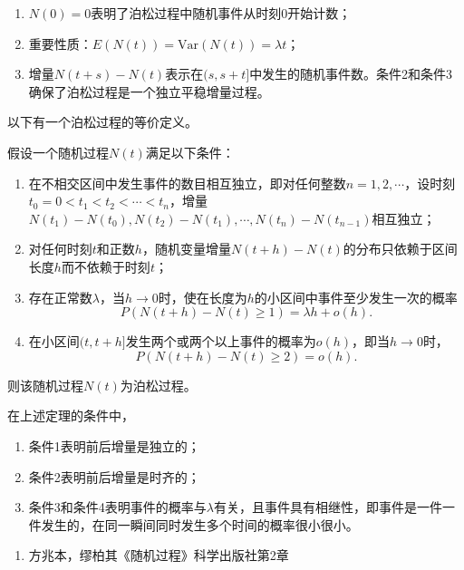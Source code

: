 \begin{remark}
    \begin{enumerate}
        \item $N(0)=0$表明了泊松过程中随机事件从时刻0开始计数；
        \item 重要性质：$E(N(t)) = \text{Var}(N(t)) = \lambda t$；
        \item 增量$N(t+s) - N(t)$表示在$(s,s+t]$中发生的随机事件数。条件2和条件3确保了泊松过程是一个独立平稳增量过程。
    \end{enumerate}
\end{remark}
以下有一个泊松过程的等价定义。
\begin{theorem}
    假设一个随机过程$N(t)$满足以下条件：
    \begin{enumerate}
        \item  在不相交区间中发生事件的数目相互独立，即对任何整数$n=1,2,\cdots$，设时刻$t_0 = 0 < t_1 < t_2 < \cdots < t_n$，增量$N(t_1) - N(t_0), N(t_2)-N(t_1),\cdots,N(t_n) - N(t_{n-1})$相互独立；
        \item 对任何时刻$t$和正数$h$，随机变量增量$N(t+h) - N(t)$的分布只依赖于区间长度$h$而不依赖于时刻$t$；
        \item 存在正常数$\lambda$，当$h\rightarrow0$时，使在长度为$h$的小区间中事件至少发生一次的概率
              $$
                  P(N(t+h) - N(t) \geq  1) = \lambda h + o(h).
              $$
        \item 在小区间$(t,t+h]$发生两个或两个以上事件的概率为$o(h)$，即当$h\rightarrow0$时，
              $$
                  P(N(t+h) - N(t) \geq  2) = o(h).
              $$
    \end{enumerate}
    则该随机过程$N(t)$为泊松过程。
\end{theorem}
\begin{remark}
    在上述定理的条件中，
    \begin{enumerate}
        \item 条件1表明前后增量是独立的；
        \item 条件2表明前后增量是时齐的；
        \item 条件3和条件4表明事件的概率与$\lambda$有关，且事件具有相继性，即事件是一件一件发生的，在同一瞬间同时发生多个时间的概率很小很小。
    \end{enumerate}
\end{remark}


\begin{enumerate}
    \item 方兆本，缪柏其《随机过程》科学出版社\quad 第2章
\end{enumerate}